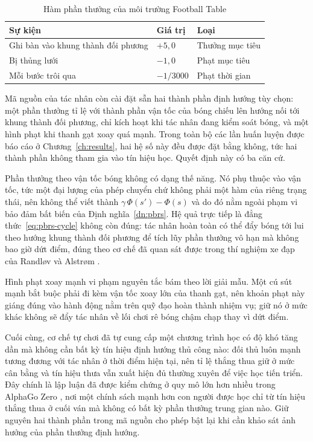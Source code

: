 \begin{table}[H]
\centering
\caption{Hàm phần thưởng của môi trường Football Table}
\label{tab:reward_football}
\renewcommand{\arraystretch}{1.4}
\tablefont
\begin{tabular}{|p{6cm}|>{\centering\arraybackslash}p{3cm}|p{4cm}|}
\hline
\textbf{Sự kiện} & \textbf{Giá trị} & \textbf{Loại} \\
\hline
Ghi bàn vào khung thành đối phương & $+5{,}0$ & Thưởng mục tiêu \\
\hline
Bị thủng lưới & $-1{,}0$ & Phạt mục tiêu \\
\hline
Mỗi bước trôi qua & $-1/3000$ & Phạt thời gian \\
\hline
\end{tabular}
\end{table}

\indent Mã nguồn của tác nhân còn cài đặt sẵn hai thành phần định hướng tùy chọn: một
phần thưởng tỉ lệ với thành phần vận tốc của bóng chiếu lên hướng nối tới khung thành
đối phương, chỉ kích hoạt khi tác nhân đang kiểm soát bóng, và một hình phạt khi thanh
gạt xoay quá mạnh. Trong toàn bộ các lần huấn luyện được báo cáo ở
Chương~\ref{ch:results}, hai hệ số này đều được đặt bằng không, tức hai thành phần
không tham gia vào tín hiệu học. Quyết định này có ba căn cứ.

\indent Phần thưởng theo vận tốc bóng không có dạng thế năng. Nó phụ thuộc vào
vận tốc, tức một đại lượng của phép chuyển chứ không phải một hàm của riêng trạng thái,
nên không thể viết thành $\gamma\,\Phi(s') - \Phi(s)$ và do đó nằm ngoài phạm vi bảo đảm
bất biến của Định nghĩa~\ref{dn:pbrs}. Hệ quả trực tiếp là đẳng thức~\eqref{eq:pbrs-cycle}
không còn đúng: tác nhân hoàn toàn có thể đẩy bóng tới lui theo hướng khung thành đối
phương để tích lũy phần thưởng vô hạn mà không bao giờ dứt điểm, đúng theo cơ chế đã
quan sát được trong thí nghiệm xe đạp của Randløv và Alstrøm \cite{randlov1998learning}.

\indent Hình phạt xoay mạnh vi phạm nguyên tắc bám theo lời giải mẫu. Một cú sút mạnh
bắt buộc phải đi kèm vận tốc xoay lớn của thanh gạt, nên khoản phạt này giáng đúng vào
hành động nằm trên quỹ đạo hoàn thành nhiệm vụ; giữ nó ở mức khác không sẽ đẩy tác nhân
về lối chơi rê bóng chậm chạp thay vì dứt điểm.

\indent Cuối cùng, cơ chế tự chơi đã tự cung cấp một chương trình học có độ khó tăng dần
mà không cần bất kỳ tín hiệu định hướng thủ công nào: đối thủ luôn mạnh tương đương với
tác nhân ở thời điểm hiện tại, nên tỉ lệ thắng thua giữ ở mức cân bằng và tín hiệu thưa
vẫn xuất hiện đủ thường xuyên để việc học tiến triển. Đây chính là lập luận đã được
kiểm chứng ở quy mô lớn hơn nhiều trong AlphaGo Zero \cite{silver2017mastering}, nơi một
chính sách mạnh hơn con người được học chỉ từ tín hiệu thắng thua ở cuối ván mà không có
bất kỳ phần thưởng trung gian nào. Giữ nguyên hai thành phần trong mã nguồn cho phép bật
lại khi cần khảo sát ảnh hưởng của phần thưởng định hướng.

